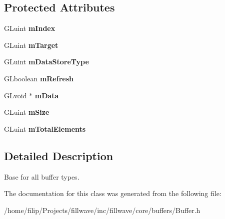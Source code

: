 \subsection*{Protected Attributes}
\begin{DoxyCompactItemize}
\item 
\hypertarget{classfillwave_1_1core_1_1Buffer_a32235dd78b278c04bd98035ed8375d19}{}G\+Luint {\bfseries m\+Index}\label{classfillwave_1_1core_1_1Buffer_a32235dd78b278c04bd98035ed8375d19}

\item 
\hypertarget{classfillwave_1_1core_1_1Buffer_a2559c70d5a09568a50d3091e69d45bb1}{}G\+Luint {\bfseries m\+Target}\label{classfillwave_1_1core_1_1Buffer_a2559c70d5a09568a50d3091e69d45bb1}

\item 
\hypertarget{classfillwave_1_1core_1_1Buffer_ab2b3a6934a4adb261723f1ff45b815d1}{}G\+Luint {\bfseries m\+Data\+Store\+Type}\label{classfillwave_1_1core_1_1Buffer_ab2b3a6934a4adb261723f1ff45b815d1}

\item 
\hypertarget{classfillwave_1_1core_1_1Buffer_ae4dc20c18344d5a3ce899ae598978d8c}{}G\+Lboolean {\bfseries m\+Refresh}\label{classfillwave_1_1core_1_1Buffer_ae4dc20c18344d5a3ce899ae598978d8c}

\item 
\hypertarget{classfillwave_1_1core_1_1Buffer_af86f454d76ba53946831c3fe9aadb51c}{}G\+Lvoid $\ast$ {\bfseries m\+Data}\label{classfillwave_1_1core_1_1Buffer_af86f454d76ba53946831c3fe9aadb51c}

\item 
\hypertarget{classfillwave_1_1core_1_1Buffer_ab4062f2530e6cedfd4bac04405d7bf8b}{}G\+Luint {\bfseries m\+Size}\label{classfillwave_1_1core_1_1Buffer_ab4062f2530e6cedfd4bac04405d7bf8b}

\item 
\hypertarget{classfillwave_1_1core_1_1Buffer_aaf51ae619c24a67411c7cd08aa6d3d92}{}G\+Luint {\bfseries m\+Total\+Elements}\label{classfillwave_1_1core_1_1Buffer_aaf51ae619c24a67411c7cd08aa6d3d92}

\end{DoxyCompactItemize}


\subsection{Detailed Description}
Base for all buffer types. 

The documentation for this class was generated from the following file\+:\begin{DoxyCompactItemize}
\item 
/home/filip/\+Projects/fillwave/inc/fillwave/core/buffers/Buffer.\+h\end{DoxyCompactItemize}

